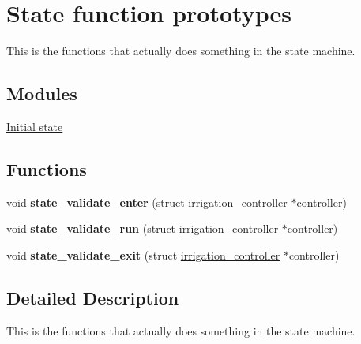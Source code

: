 \hypertarget{group__state__prototypes}{}\section{State function prototypes}
\label{group__state__prototypes}


This is the functions that actually does something in the state machine.  


\subsection*{Modules}
\begin{DoxyCompactItemize}
\item 
\hyperlink{group__state__init}{Initial state}
\end{DoxyCompactItemize}
\subsection*{Functions}
\begin{DoxyCompactItemize}
\item 
\hypertarget{group__state__prototypes_gac0d41d4685bd461b3a613f6320405b79}{}void {\bfseries state\+\_\+validate\+\_\+enter} (struct \hyperlink{structirrigation__controller}{irrigation\+\_\+controller} $\ast$controller)\label{group__state__prototypes_gac0d41d4685bd461b3a613f6320405b79}

\item 
\hypertarget{group__state__prototypes_gaec38509b93f8a850919aa7a36e543ed5}{}void {\bfseries state\+\_\+validate\+\_\+run} (struct \hyperlink{structirrigation__controller}{irrigation\+\_\+controller} $\ast$controller)\label{group__state__prototypes_gaec38509b93f8a850919aa7a36e543ed5}

\item 
\hypertarget{group__state__prototypes_gac480e756742ffd9acd9bd21ac1e8885c}{}void {\bfseries state\+\_\+validate\+\_\+exit} (struct \hyperlink{structirrigation__controller}{irrigation\+\_\+controller} $\ast$controller)\label{group__state__prototypes_gac480e756742ffd9acd9bd21ac1e8885c}

\end{DoxyCompactItemize}


\subsection{Detailed Description}
This is the functions that actually does something in the state machine. 

